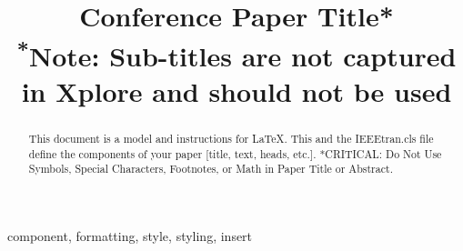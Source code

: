 \documentclass[conference]{IEEEtran}
\begin{document}
\title{Conference Paper Title*\\
{\footnotesize \textsuperscript{*}Note: Sub-titles are not captured in Xplore and
should not be used}
}

\author{
    \and
    \and
}

\maketitle

\begin{abstract}
    This document is a model and instructions for \LaTeX.
    This and the IEEEtran.cls file define the components of your paper [title, text, heads, etc.]. *CRITICAL: Do Not Use Symbols, Special Characters, Footnotes,
    or Math in Paper Title or Abstract.
\end{abstract}

\begin{IEEEkeywords}
    component, formatting, style, styling, insert
\end{IEEEkeywords}
\end{document}

